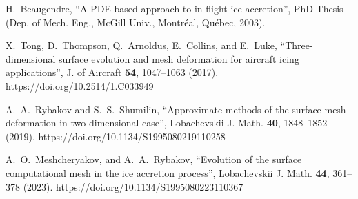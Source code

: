 \documentclass[
11pt,%
tightenlines,%
twoside,%
onecolumn,%
nofloats,%
nobibnotes,%
nofootinbib,%
superscriptaddress,%
noshowpacs,%
centertags]%
{revtex4}
\begin{document}
\begin{thebibliography}{99}
H.~Beaugendre, \textquotedblleft A PDE-based approach to in-flight ice accretion\textquotedblright, PhD Thesis (Dep. of Mech. Eng., McGill Univ., Montr\'eal, Qu\'ebec, 2003).

X.~Tong, D.~Thompson, Q.~Arnoldus, E.~Collins, and E.~Luke, \textquotedblleft Three-dimensional  surface evolution and mesh deformation for aircraft icing applications\textquotedblright, J. of Aircraft {\bf 54}, 1047--1063 (2017). https://doi.org/10.2514/1.C033949

A.~A.~Rybakov and S.~S.~Shumilin, \textquotedblleft Approximate  methods of the surface mesh deformation in two-dimensional case\textquotedblright, Lobachevskii J. Math. {\bf 40}, 1848--1852 (2019). https://doi.org/10.1134/S1995080219110258

A.~O.~Meshcheryakov, and A.~A.~Rybakov, \textquotedblleft Evolution of the surface computational mesh in the ice accretion process\textquotedblright, Lobachevskii J. Math. {\bf 44}, 361--378 (2023). https://doi.org/10.1134/S1995080223110367

\end{thebibliography}
\end{document}
